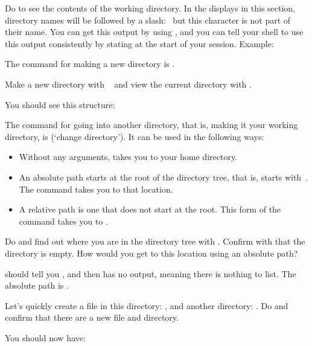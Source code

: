 Do  to see the contents of the working directory. In the
displays in this section, directory names will be followed by a
slash:~ but this character is not part of their name.  You can
get this output by using , and you can tell your shell to
use this output consistently by stating  at the start of your
session. Example:


The command for making a new directory is .

\begin{exercise}
  Make a new directory with ~ and view
  the current directory with .
\end{exercise}
\begin{outcome}
  You should see this structure:
\end{outcome}

The command for going into another directory, that is, making it your
working directory, is  (`change directory'). It can be used in
the following ways:
\begin{itemize}
\item {} Without any arguments,  takes you to your home directory.
\item {} An absolute path starts at the root of
  the directory tree, that is, starts with~\n{/}. The  command
  takes you to that location.
\item {} A relative path is one that does not
  start at the root. This form of the  command takes you to
  .
\end{itemize}

\begin{exercise}
  Do  and find out where you are in the directory tree
  with .  Confirm with  that the directory is empty.  How
  would you get to this location using an absolute path?
\end{exercise}
\begin{outcome}
   should tell you , and  then has no
  output, meaning there is nothing to list.  The absolute path is
  .
\end{outcome}

\begin{exercise}
  Let's quickly create a file in this directory: 
  , and another directory: .  Do 
  and confirm that there are a new file and directory.
\end{exercise}
\begin{outcome}
  You should now have: 
\end{outcome}

